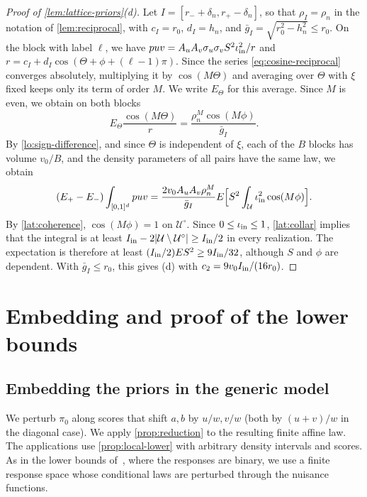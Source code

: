 \begin{proof}[Proof of \cref{lem:lattice-priors}(d)]
Let $I=[r_-+\delta_n,r_+-\delta_n]$, so that $\rho_I=\rho_n$ in the
notation of \cref{lem:reciprocal}, with $c_I=r_0$, $d_I=h_n$, and
$\bar g_I=\sqrt{r_0^2-h_n^2}\le r_0$. On the block with label $\ell$,
we have $puv=A_uA_v\sigma_u\sigma_vS^2\iota_{\rm in}^2/r$
and $r=c_I+d_I\cos(\Theta+\phi+(\ell-1)\pi)$. Since the series
\eqref{eq:cosine-reciprocal} converges absolutely, multiplying
it by $\cos(M\Theta)$ and averaging over $\Theta$ with $\xi$ fixed keeps
only its term of order $M$. We write $E_\Theta$ for this average. Since
$M$ is even, we obtain on both blocks
\[
 E_\Theta\frac{\cos(M\Theta)}{r}=\frac{\rho_n^M\cos(M\phi)}{\bar g_I}.
\]
By \eqref{lo:sign-difference}, and since $\Theta$ is independent of
$\xi$, each of the $B$ blocks has volume $v_0/B$, and the density
parameters of all pairs have the same law, we obtain
\[
 (E_+-E_-)\int_{[0,1]^d}puv
 =\frac{2v_0A_uA_v\rho_n^M}{\bar g_I}
 E\Bigl[S^2\int_{\mathcal U}\iota_{\rm in}^2\cos(M\phi)\Bigr].
\]
By \eqref{lat:coherence}, $\cos(M\phi)=1$ on $\mathcal U^\circ$. Since
$0\le\iota_{\rm in}\le1$, \eqref{lat:collar} implies that the integral
is at least $I_{\rm in}-2|\mathcal U\setminus\mathcal U^\circ|\ge I_{\rm in}/2$
in every realization. The expectation is therefore at least
$(I_{\rm in}/2)ES^2\ge9I_{\rm in}/32$, although $S$ and $\phi$ are
dependent. With $\bar g_I\le r_0$, this gives (d) with
$c_2=9v_0I_{\rm in}/(16r_0)$.
\end{proof}
\chapter{Embedding and proof of the lower bounds}
\label{sec:lower-proof}\label{emb:lower-proof}

\section{Embedding the priors in the generic model}
\label{sec:generic-embedding}

We perturb $\pi_0$ along scores that shift $a,b$ by $u/w,v/w$
(both by $(u+v)/w$ in the diagonal case). We apply
\cref{prop:reduction} to the resulting finite affine law.
The applications use \cref{prop:local-lower} with arbitrary
density intervals and scores. As in the lower bounds
of~\cite[Sections~3--4]{robins2009}, where the responses are binary, we
use a finite response space whose conditional laws are perturbed through
the nuisance functions.

